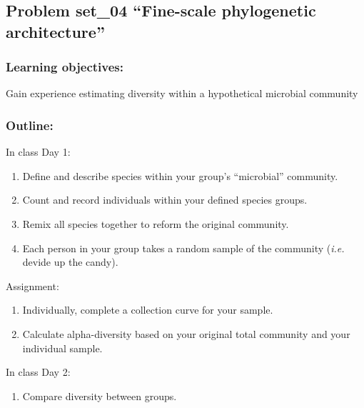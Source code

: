 \documentclass[]{article}
\providecommand{\tightlist}{%
  \setlength{\itemsep}{0pt}\setlength{\parskip}{0pt}}
\begin{document}
\subsection{\texorpdfstring{Problem set\_04 ``Fine-scale phylogenetic
architecture''}{Problem set\_04 Fine-scale phylogenetic architecture}}\label{problem-set_04-fine-scale-phylogenetic-architecture}

\subsubsection{Learning objectives:}\label{learning-objectives-6}

Gain experience estimating diversity within a hypothetical microbial
community

\subsubsection{Outline:}\label{outline}

In class Day 1:

\begin{enumerate}
\def\labelenumi{\arabic{enumi}.}
\tightlist
\item
  Define and describe species within your group's ``microbial''
  community.
\item
  Count and record individuals within your defined species groups.
\item
  Remix all species together to reform the original community.
\item
  Each person in your group takes a random sample of the community
  (\emph{i.e.} devide up the candy).
\end{enumerate}

Assignment:

\begin{enumerate}
\def\labelenumi{\arabic{enumi}.}
\setcounter{enumi}{4}
\tightlist
\item
  Individually, complete a collection curve for your sample.
\item
  Calculate alpha-diversity based on your original total community and
  your individual sample.
\end{enumerate}

In class Day 2:

\begin{enumerate}
\def\labelenumi{\arabic{enumi}.}
\setcounter{enumi}{6}
\tightlist
\item
  Compare diversity between groups.
\end{enumerate}
\end{document}
